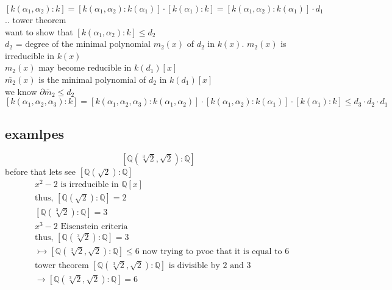 \documentclass{article}
\begin{document}
$[k(\alpha_1,\alpha_2):k]= [k(\alpha_1,\alpha_2):k(\alpha_1)] \cdot [k(\alpha_1):k] = [k(\alpha_1,\alpha_2):k(\alpha_1)] \cdot d_1$ .. tower theorem \\ 
want to show that $[k(\alpha_1,\alpha_2):k] \leq d_2$ \\
$d_2$ = degree of the minimal polynomial $m_2(x)$ of $d_2$ in $k(x)$. $m_2(x)$ is irreducible in $k(x)$ \\

$m_2(x)$ may become reducible in $k(d_1)[x]$ \\
$\bar{m_2}(x)$ is the minimal polynomial of $d_2$ in $k(d_1)[x]$ \\
we know $\partial \bar{m}_2 \leq d_2$ \\

$[k(\alpha_1, \alpha_2, \alpha_3): k ] = [k(\alpha_1, \alpha_2, \alpha_3): k(\alpha_1, \alpha_2)] \cdot [k(\alpha_1, \alpha_2): k(\alpha_1)] \cdot [k(\alpha_1): k] \leq d_3 \cdot d_2 \cdot d_1$ \\

\subsection{examlpes}
$$[\mathbb{Q}(\sqrt[3]{2}, \sqrt{2}): \mathbb{Q}]$$
before that lets see $[\mathbb{Q}(\sqrt{2}) : \mathbb{Q}]$
\begin{align*}
    &x^2 - 2 \text{ is irreducible in } \mathbb{Q}[x] \\ 
    &\text{thus, }     [\mathbb{Q}(\sqrt{2}) : \mathbb{Q}] = 2\\ 
    &[\mathbb{Q}(\sqrt[3]{2}) : \mathbb{Q}]  = 3 \\ 
    &x^3 - 2 \text{ Eisenstein criteria } \\ 
    &\text{thus, } [\mathbb{Q}(\sqrt[3]{2}) : \mathbb{Q}] = 3\\ 
    &\rightarrowtail[\mathbb{Q}(\sqrt[3]{2}, \sqrt{2}): \mathbb{Q}] \leq 6 \text{ now trying to pvoe that it is equal to 6}\\ 
    &\text{tower theorem }[\mathbb{Q}(\sqrt[3]{2}, \sqrt{2}): \mathbb{Q}] \text{ is divisible by 2 and 3}  \\ 
    &\rightarrow [\mathbb{Q}(\sqrt[3]{2}, \sqrt{2}): \mathbb{Q}] = 6
\end{align*} 
\end{document}

